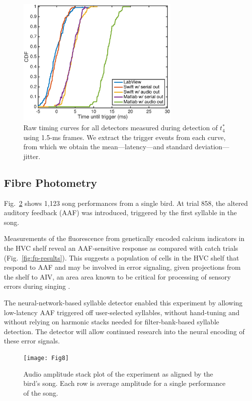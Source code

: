 \documentclass[10pt,letterpaper]{article}
\newcommand\fig[1]{Fig.~\ref{#1}}
\begin{document}
\begin{figure}
  \begin{center}
    \includegraphics[width=8cm]{Fig7}
  \end{center}
  \caption{Raw timing curves for all detectors measured during
    detection of $t^*_4$ using 1.5-ms frames.  We extract the trigger events from each curve, from which we obtain the mean---latency---and
    standard deviation---jitter.}
  \label{fig:timing}
\end{figure}

\subsection{Fibre Photometry}
\label{sec:fp-results}

\fig{fig:fp-audio} shows 1,123 song performances from a single bird. 
At trial 858, the altered auditory feedback (AAF) was introduced, 
triggered by the first syllable in the song.

Measurements of the fluorescence from genetically encoded calcium indicators
in the HVC shelf reveal an AAF-sensitive response as compared with catch trials
(\fig{fig:fp-results}). This suggests a population of cells in the HVC
shelf that respond to AAF and may be involved in error signaling, given projections
from the shelf to AIV, an area area known to be critical for processing of 
sensory errors during singing \cite{MandelblatCerf:2014eu}.

The neural-network-based syllable detector enabled this experiment
by allowing low-latency AAF triggered off user-selected syllables, 
without hand-tuning and without relying on harmonic stacks needed 
for filter-bank-based syllable detection. The detector will allow
continued research into the neural encoding of these error signals.

\begin{figure}
  \begin{center}
    \texttt{[image: Fig8]}
  \end{center}
  \caption{Audio amplitude stack plot of the experiment as aligned by 
  the bird's song. Each row is average amplitude for a single performance
  of the song.}
  \label{fig:fp-audio}
\end{figure}
\end{document}
